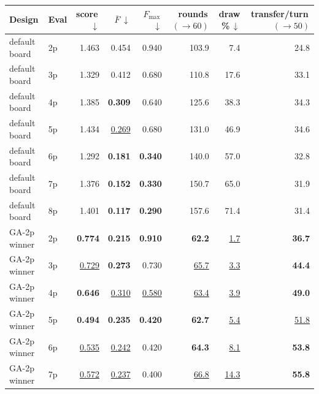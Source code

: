 \documentclass[10pt]{article}
\begin{document}
\begin{table}[!htbp]
\centering
\scriptsize
\renewcommand{\arraystretch}{0.92}
\begin{tabular}{llrrrrrr}
\toprule
Design & Eval & score\,$\downarrow$ & $\overline{F}$\,$\downarrow$ & $F_{\max}$\,$\downarrow$ & rounds\,$(\!\to\!60)$ & draw \%\,$\downarrow$ & transfer/turn\,$(\!\to\!50)$ \\
\midrule
default board & 2p & 1.463          & 0.454             & 0.940          & 103.9            &  7.4             & 24.8 \\
default board & 3p & 1.329          & 0.412             & 0.680          & 110.8            & 17.6             & 33.1 \\
default board & 4p & 1.385          & \textbf{0.309}    & 0.640          & 125.6            & 38.3             & 34.3 \\
default board & 5p & 1.434          & \underline{0.269} & 0.680          & 131.0            & 46.9             & 34.6 \\
default board & 6p & 1.292          & \textbf{0.181}    & \textbf{0.340} & 140.0            & 57.0             & 32.8 \\
default board & 7p & 1.376          & \textbf{0.152}    & \textbf{0.330} & 150.7            & 65.0             & 31.9 \\
default board & 8p & 1.401          & \textbf{0.117}    & \textbf{0.290} & 157.6            & 71.4             & 31.4 \\
\addlinespace
GA-2p winner  & 2p & \textbf{0.774}    & \textbf{0.215}    & \textbf{0.910} & \textbf{62.2}    & \underline{1.7}  & \textbf{36.7} \\
GA-2p winner  & 3p & \underline{0.729} & \textbf{0.273}    & 0.730          & \underline{65.7} & \underline{3.3}  & \textbf{44.4} \\
GA-2p winner  & 4p & \textbf{0.646}    & \underline{0.310} & \underline{0.580} & \underline{63.4} & \underline{3.9}  & \textbf{49.0} \\
GA-2p winner  & 5p & \textbf{0.494}    & \textbf{0.235}    & \textbf{0.420} & \textbf{62.7}    & \underline{5.4}  & \underline{51.8} \\
GA-2p winner  & 6p & \underline{0.535} & \underline{0.242} & 0.420          & \textbf{64.3}    & \underline{8.1}  & \textbf{53.8} \\
GA-2p winner  & 7p & \underline{0.572} & \underline{0.237} & 0.400          & \underline{66.8} & \underline{14.3} & \textbf{55.8} \\

\end{tabular}
\end{table}
\end{document}
